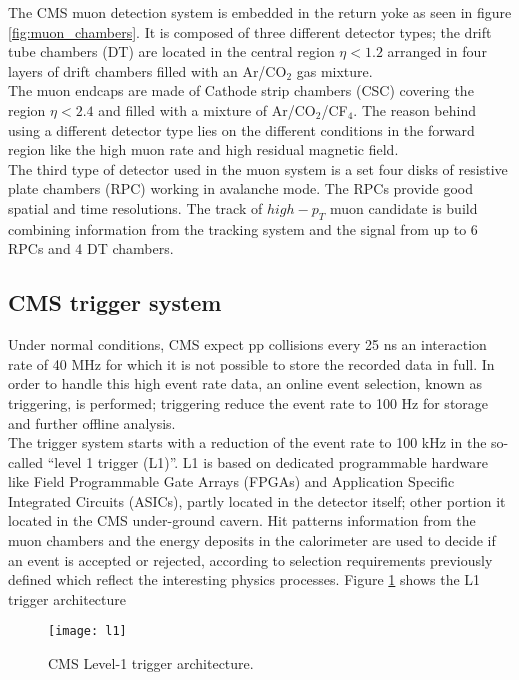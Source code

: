 \noindent The CMS muon detection system is embedded in the return yoke as seen in figure \ref{fig:muon_chambers}. It is composed of three different detector types; the drift tube chambers (DT) are located in the central region $\eta< 1.2$ arranged in four layers of drift chambers filled with an Ar/CO$_2$ gas mixture.\\

\noindent The muon endcaps are made of Cathode strip chambers (CSC) covering the region $\eta< 2.4$ and filled with a mixture of Ar/CO$_2$/CF$_4$. The reason behind using a different detector type lies on the different conditions in the forward region like the high muon rate and high residual magnetic field.\\

\noindent The third type of detector used in the muon system is a set four disks of resistive plate chambers (RPC) working in avalanche mode. The RPCs provide good spatial and time resolutions. The track of $high-p_T$ muon candidate is build combining information from the tracking system and the signal from up to 6 RPCs and 4 DT chambers.


\subsection{CMS trigger system}

\noindent Under normal conditions, CMS expect pp collisions every 25 ns \ie an interaction rate of 40 MHz for which it is not possible to store the recorded data in full. In order to handle this high event rate data, an online event selection, known as triggering, is performed; triggering reduce the event rate to 100 Hz for storage and further offline analysis.\\        

\noindent The trigger system starts with a reduction of the event rate to 100 kHz in the so-called ``level 1 trigger (L1)''. L1 is based on dedicated programmable hardware like Field Programmable Gate Arrays (FPGAs) and Application Specific Integrated Circuits (ASICs), partly located in the detector itself; other portion it located in the CMS under-ground cavern. Hit patterns information from the muon chambers and the energy deposits in the calorimeter are used to decide if an event is accepted or rejected, according to selection requirements previously defined which reflect the interesting physics processes. Figure \ref{fig:l1} shows the L1 trigger architecture

\begin{figure}[h!]
  \centering
  \texttt{[image: l1]}
  \caption[CMS Level-1 trigger architecture]{CMS Level-1 trigger architecture\cite{l1}. }
  \label{fig:l1}
\end{figure}

